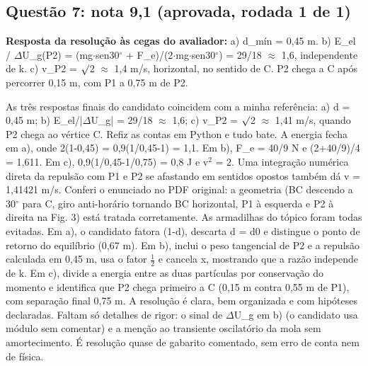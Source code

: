 \documentclass{article}%
\begin{document}
\subsection*{Questão 7: nota 9,1 (aprovada, rodada 1 de 1)}%
\textbf{Resposta da resolução às cegas do avaliador:} a) d\_mín = 0,45 m.\newline%
b) E\_el / $\Delta$U\_g(P2) = (mg$\cdot$sen30$^\circ$ + F\_e)/(2$\cdot$mg$\cdot$sen30$^\circ$) = 29/18 $\approx$ 1,6, independente de k.\newline%
c) v\_P2 = $\surd$2 $\approx$ 1,4 m/s, horizontal, no sentido de C. P2 chega a C após percorrer 0,15 m, com P1 a 0,75 m de P2.\par %
As três respostas finais do candidato coincidem com a minha referência: a) d = 0,45 m; b) E\_el/|$\Delta$U\_g| = 29/18 $\approx$ 1,6; c) v\_P2 = $\surd$2 $\approx$ 1,41 m/s, quando P2 chega ao vértice C. Refiz as contas em Python e tudo bate. A energia fecha em a), onde 2(1-0,45) = 0,9(1/0,45-1) = 1,1. Em b), F\_e = 40/9 N e (2+40/9)/4 = 1,611. Em c), 0,9(1/0,45-1/0,75) = 0,8 J e v$^2$ = 2. Uma integração numérica direta da repulsão com P1 e P2 se afastando em sentidos opostos também dá v = 1,41421 m/s. Conferi o enunciado no PDF original: a geometria (BC descendo a 30$^\circ$ para C, giro anti{-}horário tornando BC horizontal, P1 à esquerda e P2 à direita na Fig. 3) está tratada corretamente. As armadilhas do tópico foram todas evitadas. Em a), o candidato fatora (1-d), descarta d = d0 e distingue o ponto de retorno do equilíbrio (0,67 m). Em b), inclui o peso tangencial de P2 e a repulsão calculada em 0,45 m, usa o fator $\frac12$ e cancela x, mostrando que a razão independe de k. Em c), divide a energia entre as duas partículas por conservação do momento e identifica que P2 chega primeiro a C (0,15 m contra 0,55 m de P1), com separação final 0,75 m. A resolução é clara, bem organizada e com hipóteses declaradas. Faltam só detalhes de rigor: o sinal de $\Delta$U\_g em b) (o candidato usa módulo sem comentar) e a menção ao transiente oscilatório da mola sem amortecimento. É resolução quase de gabarito comentado, sem erro de conta nem de física.%
\end{document}
